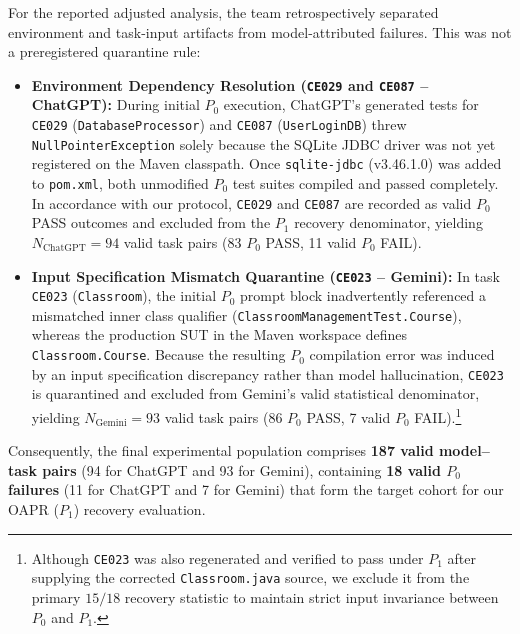 For the reported adjusted analysis, the team retrospectively separated environment and task-input artifacts from model-attributed failures. This was not a preregistered quarantine rule:
\begin{itemize}
    \item \textbf{Environment Dependency Resolution (\texttt{CE029} and \texttt{CE087} -- ChatGPT):} During initial $P_0$ execution, ChatGPT's generated tests for \texttt{CE029} (\texttt{Database\allowbreak Processor}) and \texttt{CE087} (\texttt{UserLoginDB}) threw \texttt{NullPointer\allowbreak Exception} solely because the SQLite JDBC driver was not yet registered on the Maven classpath. Once \texttt{sqlite-\allowbreak jdbc} (v3.46.1.0) was added to \texttt{pom.xml}, both unmodified $P_0$ test suites compiled and passed completely. In accordance with our protocol, \texttt{CE029} and \texttt{CE087} are recorded as valid $P_0$ PASS outcomes and excluded from the $P_1$ recovery denominator, yielding $N_{\text{ChatGPT}} = 94$ valid task pairs (83 $P_0$ PASS, 11 valid $P_0$ FAIL).
    \item \textbf{Input Specification Mismatch Quarantine (\texttt{CE023} -- Gemini):} In task \texttt{CE023} (\texttt{Classroom}), the initial $P_0$ prompt block inadvertently referenced a mismatched inner class qualifier (\texttt{Classroom\allowbreak Management\allowbreak Test.\allowbreak Course}), whereas the production SUT in the Maven workspace defines \texttt{Classroom.\allowbreak Course}. Because the resulting $P_0$ compilation error was induced by an input specification discrepancy rather than model hallucination, \texttt{CE023} is quarantined and excluded from Gemini's valid statistical denominator, yielding $N_{\text{Gemini}} = 93$ valid task pairs (86 $P_0$ PASS, 7 valid $P_0$ FAIL).\footnote{Although \texttt{CE023} was also regenerated and verified to pass under $P_1$ after supplying the corrected \texttt{Classroom.java} source, we exclude it from the primary $15/18$ recovery statistic to maintain strict input invariance between $P_0$ and $P_1$.}
\end{itemize}
Consequently, the final experimental population comprises \textbf{187 valid model--task pairs} (94 for ChatGPT and 93 for Gemini), containing \textbf{18 valid $P_0$ failures} (11 for ChatGPT and 7 for Gemini) that form the target cohort for our OAPR ($P_1$) recovery evaluation.
